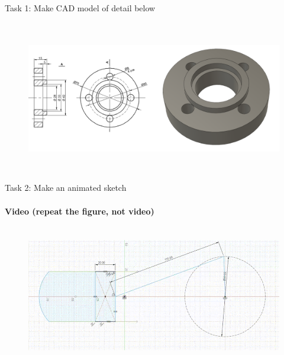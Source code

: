 \documentclass[aspectratio=169]{beamer}
\begin{document}
\begin{frame}[t]{Task 1: Make CAD model of detail below}
\framesubtitle{}
    \vspace{-0.6cm}
    \begin{figure}[H]
        \centering\includegraphics[height=6.5cm,width=1\textwidth,keepaspectratio]{resources/task_1.png}
        \label{fig:resources/task_1.png}
    \end{figure}
\end{frame}

\begin{frame}[t]{Task 2: Make an animated sketch}
    \framesubtitle{Video (repeat the figure, not video)}
    \vspace{-0.6cm}
    \begin{figure}[H]
        \href{https://youtu.be/KohY2-krw1I}{
            \centering\includegraphics[height=6cm,width=1\textwidth,keepaspectratio]{resources/task_2.png}}
        \label{fig:task_2.png}
    \end{figure}
\end{frame}
\end{document}
